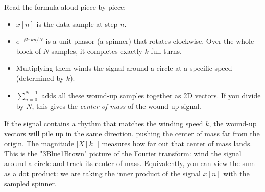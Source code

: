 \begin{intuitionbox}
Read the formula aloud piece by piece:
\begin{itemize}
\item $x[n]$ is the data sample at step $n$.
\item $e^{-\jj 2\pi k n / N}$ is a unit phasor (a spinner) that rotates clockwise. Over the whole block of $N$ samples, it completes exactly $k$ full turns.
\item Multiplying them winds the signal around a circle at a specific speed (determined by $k$).
\item $\sum_{n=0}^{N-1}$ adds all these wound-up samples together as 2D vectors. If you divide by $N$, this gives the \emph{center of mass} of the wound-up signal.
\end{itemize}
If the signal contains a rhythm that matches the winding speed $k$, the wound-up vectors will pile up in the same direction, pushing the center of mass far from the origin. The magnitude $|X[k]|$ measures how far out that center of mass lands. This is the "3Blue1Brown" picture of the Fourier transform: wind the signal around a circle and track its center of mass. Equivalently, you can view the sum as a dot product: we are taking the inner product of the signal $x[n]$ with the sampled spinner.
\end{intuitionbox}

